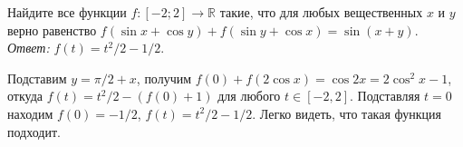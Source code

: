 \problem{}
Найдите все функции $f \colon [-2; 2] \to \mathbb{R}$ такие, что для любых
вещественных $x$ и $y$ верно равенство
$f(\sin x + \cos y) + f(\sin y + \cos x) = \sin(x + y)$.
\solution
\emph{Ответ:} $f(t) = t^2 / 2 - 1/2$.
\par
Подставим $y = \pi / 2 + x$, получим
$f(0) + f(2 \cos x) = \cos 2 x = 2 \cos^2 x - 1$,
откуда $f(t) = t^2 / 2 - (f(0) + 1)$ для любого $t \in [-2,2]$.
Подставляя $t = 0$ находим $f(0) = -1 / 2$, $f(t) = t^2 / 2 - 1/2$.
Легко видеть, что такая функция подходит.
\endproblem
